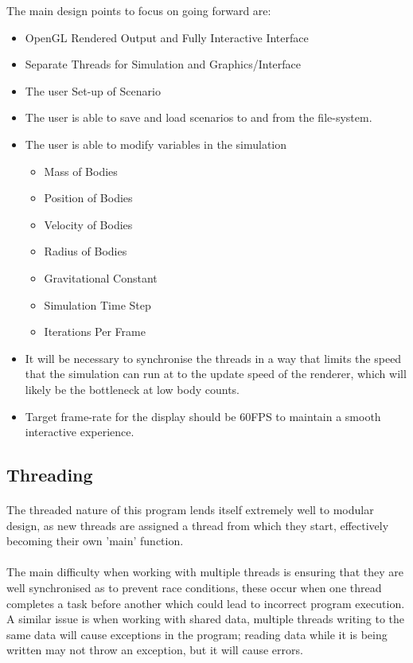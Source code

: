 The main design points to focus on going forward are:
\begin{itemize}
\item OpenGL Rendered Output and Fully Interactive Interface
\item Separate Threads for Simulation and Graphics/Interface
\item The user Set-up of Scenario
\item The user is able to save and load scenarios to and from the file-system.
\item The user is able to modify variables in the simulation
  \begin{itemize}
  \item Mass of Bodies
  \item Position of Bodies
  \item Velocity of Bodies
  \item Radius of Bodies
  \item Gravitational Constant
  \item Simulation Time Step
  \item Iterations Per Frame
  \end{itemize}
\item It will be necessary to synchronise the threads in a way that limits the speed that the simulation can run at to the update speed of the renderer, which will likely be the bottleneck at low body counts.
\item Target frame-rate for the display should be 60FPS to maintain a smooth interactive experience.
\end{itemize}

\subsection{Threading}
\paragraph{}
The threaded nature of this program lends itself extremely well to modular design, as new threads are assigned a thread from which they start, effectively becoming their own 'main' function.

\paragraph{}
The main difficulty when working with multiple threads is ensuring that they are well synchronised as to prevent race conditions, these occur when one thread completes a task before another which could lead to incorrect program execution. A similar issue is when working with shared data, multiple threads writing to the same data will cause exceptions in the program; reading data while it is being written may not throw an exception, but it will cause errors.

